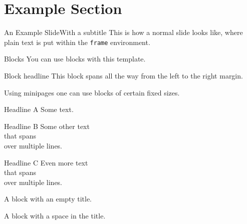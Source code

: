 \documentclass[final]{beamer}
\begin{document}
\section{Example Section}
\begin{frame}[t]{An Example Slide}{With a subtitle}
  This is how a normal slide looks like, where plain text is put
  within the \texttt{frame} environment.
\end{frame}
%
%
%
%
%
\begin{frame}[t]{Blocks}{}
  You can use blocks with this template.
  \begin{block}{Block headline}
    This block spans all the way from the left to the right margin.
  \end{block}
  Using minipages one can use blocks of certain fixed sizes.\\
  \noindent%
  \begin{minipage}[t]{0.45\textwidth}
    \begin{block}{Headline A}
      Some text.
    \end{block}
  \end{minipage}
  \hfill%
  \begin{minipage}[t]{0.2\textwidth}
    \begin{block}{Headline B}
      Some other text\\
      that spans\\
      over multiple lines.
    \end{block}
  \end{minipage}
  \hfill%
  \begin{minipage}[t]{0.2\textwidth}
    \begin{block}{Headline C}
      Even more text\\
      that spans\\
      over multiple lines.
    \end{block}
  \end{minipage}

  \begin{block}{}
    A block with an empty title.
  \end{block}

  \begin{block}{ }
    A block with a space in the title.
  \end{block}
\end{frame}
\end{document}
